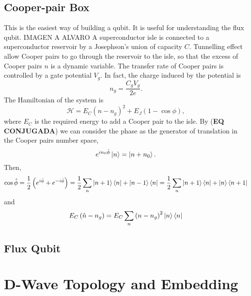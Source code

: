 \subsection{Cooper-pair Box}
This is the easiest way of building a qubit. It is useful for understanding the flux qubit.
IMAGEN A ALVARO
A superconductor isle is connected to a superconductor reservoir by a Josephson's union of capacity $C$.
Tunnelling effect allow Cooper pairs to go through the reservoir to the isle, so that the excess of Cooper pairs $n$ is a dynamic variable. The transfer rate of Cooper pairs is controlled by a gate potential $V_{g}$. In fact, the charge induced by the potential is
\begin{equation}
n_{g} =\frac{C_{g}V_{g}}{2e}.
\end{equation}
The Hamiltonian of the system is
\begin{equation}
\mathcal{H} = E_{C}\left(n - n_{g}\right)^{2} + E_{J}\left(1 - \cos{\phi}\right),
\end{equation}
where $E_{C}$ is the required energy to add a Cooper pair to the isle.
By (\textbf{EQ CONJUGADA}) we can consider the phase as the generator of translation in the Cooper pairs number space, 
\begin{equation}
e^{in_{0}\hat{\phi}}\ket{n} = \ket{n + n_{0}}.
\end{equation}
Then,
\begin{equation}
\cos{\hat{\phi}} = \frac{1}{2}\left(e^{i\hat{\phi}} + e^{-i\hat{\phi}} \right) = \frac{1}{2}\sum_{n}\ket{n+1}\bra{n} + \ket{n-1}\bra{n} = \frac{1}{2}\sum_{n}\ket{n+1}\bra{n} + \ket{n}\bra{n+1}
\end{equation}
and
\begin{equation}
E_{C}\left(\hat{n} - n_{g}\right) = E_{C}\sum_{n}\left(n -n_{g}\right)^{2}\ket{n}\bra{n}
\end{equation}
\subsection{Flux Qubit}
\section{D-Wave Topology and Embedding}